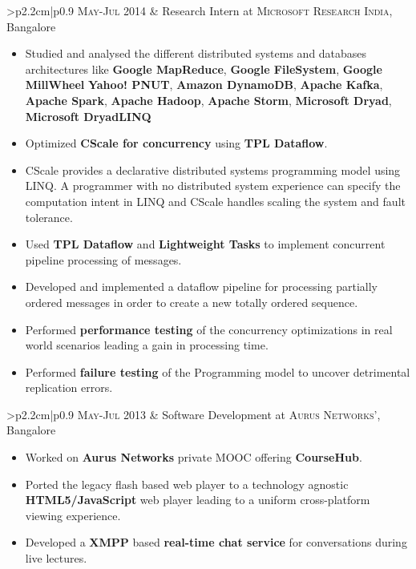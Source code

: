 \documentclass[a4paper,10pt]{article} %
\newcommand{\work}[3]{
    \begin{tabular}{>{\raggedleft}p{2.2cm}|p{0.9\linewidth}}
        \textsc{#1} & \textcolor{NavyBlue}{#2}
                    \footnotesize{#3}
    \end{tabular}
}
\begin{document}
\work {May-Jul 2014}
      {Research Intern at \textsc{Microsoft Research India}, Bangalore}
      {
         \begin{itemize}[leftmargin=*]
             \item Studied and analysed the different distributed systems and
                 databases architectures like \textbf{Google MapReduce}, \textbf{Google FileSystem},
                 \textbf{Google MillWheel} \textbf{Yahoo! PNUT}, \textbf{Amazon DynamoDB}, \textbf{Apache
                 Kafka}, \textbf{Apache Spark}, \textbf{Apache Hadoop}, \textbf{Apache Storm},
                 \textbf{Microsoft Dryad}, \textbf{Microsoft DryadLINQ}
             \item Optimized \textbf{CScale for concurrency} using \textbf{TPL
                     Dataflow}.
             \item CScale provides a declarative distributed systems programming
                 model using LINQ. A programmer with no distributed system
                 experience can specify the computation intent in LINQ and
                 CScale handles scaling the system and fault tolerance.
             \item Used \textbf{TPL Dataflow} and \textbf{Lightweight Tasks} to
                 implement concurrent pipeline processing of messages.
             \item Developed and implemented a dataflow pipeline for processing
                 partially ordered messages in order to create a new totally
                 ordered sequence.
             \item Performed \textbf{performance testing} of the concurrency optimizations
                 in real world scenarios leading a gain in processing time.
             \item Performed \textbf{failure testing} of the Programming model
                 to uncover detrimental replication errors.
         \end{itemize}
     }

\work {May-Jul 2013}
      {Software Development at \textsc{Aurus Networks'}, Bangalore}
      {
          \begin{itemize}[leftmargin=*]
              \item Worked on \textbf{Aurus Networks} private MOOC offering \textbf{CourseHub}.
              \item Ported the legacy flash based web player to a technology
                  agnostic \textbf{HTML5/JavaScript} web player leading to a
                  uniform cross-platform viewing experience.
              \item Developed a \textbf{XMPP} based \textbf{real-time chat service} for
                  conversations during live lectures.
          \end{itemize}
      }
\end{document}
